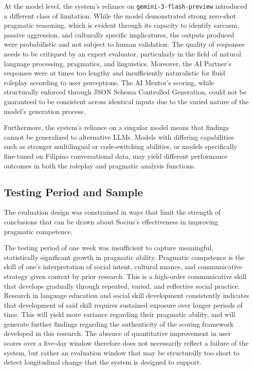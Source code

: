At the model level, the system's reliance on \texttt{gemini-3-flash-preview}
introduced a different class of limitation. While the model demonstrated strong
zero-shot pragmatic reasoning, which is evident through its capacity to identify sarcasm,
passive aggression, and culturally specific implicatures, the outputs produced were
probabilistic and not subject to human validation. The quality of responses needs to be critiqued by an expert evaluator, particularly
in the field of natural language processing, pragmatics, and linguistics. Moreover, the AI Partner's responses
were at times too lengthy and insufficiently naturalistic for fluid roleplay according to user perceptions. 
The AI Mentor's scoring, while structurally enforced through JSON Schema
Controlled Generation, could not be guaranteed to be consistent across identical
inputs due to the varied nature of the model's generation process. 

Furthermore, the system's reliance on a singular model means that
findings cannot be generalized to alternative LLMs. Models with differing capabilities such as stronger
multilingual or code-switching abilities, or models specifically fine-tuned on Filipino
conversational data, may yield different performance outcomes in
both the roleplay and pragmatic analysis functions.


\subsection{Testing Period and Sample}\label{subsec:test-limitations}

The evaluation design was constrained in ways that limit the strength of
conclusions that can be drawn about Socius's effectiveness in improving pragmatic
competence.

The testing period of one week was insufficient to capture meaningful,
statistically significant growth in pragmatic ability. Pragmatic competence is the skill of
one's interpretation of social intent, cultural nuance, and
communicative strategy given context by prior research. This is a high-order communicative skill that
develops gradually through repeated, varied, and reflective social practice.
Research in language education and social skill development consistently indicates
that development of said skill requires sustained exposure over longer periods of time. This will yield
more variance regarding their pragmatic ability, and will generate further findings regarding the authenticity of the
scoring framework developed in this research. The absence of quantitative
improvement in user scores over a five-day window therefore does not necessarily reflect a
failure of the system, but rather an evaluation window that may be structurally
too short to detect longitudinal change that the system is designed to support.

